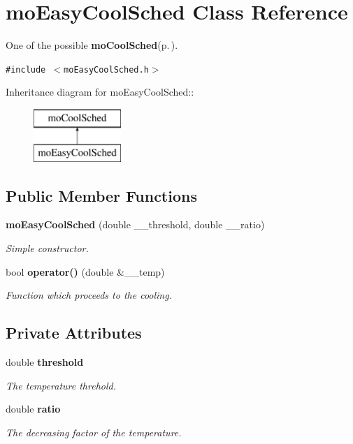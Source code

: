 \section{mo\-Easy\-Cool\-Sched Class Reference}
\label{classmo_easy_cool_sched}
One of the possible {\bf mo\-Cool\-Sched}{\rm (p.\,\pageref{classmo_cool_sched})}.  


{\tt \#include $<$mo\-Easy\-Cool\-Sched.h$>$}

Inheritance diagram for mo\-Easy\-Cool\-Sched::\begin{figure}[H]
\begin{center}
\leavevmode
\includegraphics[height=2cm]{classmo_easy_cool_sched}
\end{center}
\end{figure}
\subsection*{Public Member Functions}
\begin{CompactItemize}
\item 
{\bf mo\-Easy\-Cool\-Sched} (double \_\-\_\-threshold, double \_\-\_\-ratio)
\begin{CompactList}\small\item\em Simple constructor. \item\end{CompactList}\item 
bool {\bf operator()} (double \&\_\-\_\-temp)
\begin{CompactList}\small\item\em Function which proceeds to the cooling. \item\end{CompactList}\end{CompactItemize}
\subsection*{Private Attributes}
\begin{CompactItemize}
\item 
double {\bf threshold}\label{classmo_easy_cool_sched_3dd53700390b7bb6428db80e01626c83}

\begin{CompactList}\small\item\em The temperature threhold. \item\end{CompactList}\item 
double {\bf ratio}\label{classmo_easy_cool_sched_1f84deff87defafd927e8c323b188f38}

\begin{CompactList}\small\item\em The decreasing factor of the temperature. \item\end{CompactList}\end{CompactItemize}


